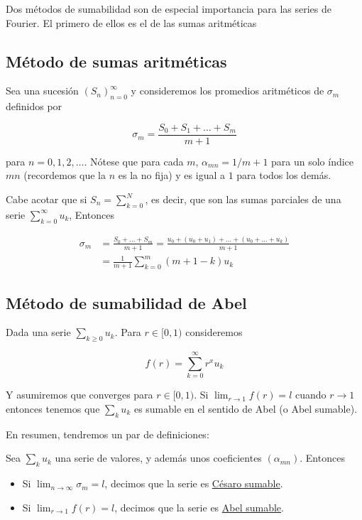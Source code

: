 Dos métodos de sumabilidad son de especial importancia para las series de Fourier. El primero de ellos es el de las sumas aritméticas

\subsection{Método de sumas aritméticas}

Sea una sucesión $(S_n)_{n=0}^{\infty}$ y consideremos los promedios aritméticos de $\sigma_m$ definidos por

\[
    \sigma_m = \frac{S_0 + S_1 + \dots + S_m}{m + 1}
\]

\noindent para $n = 0, 1, 2, \dots$. Nótese que para cada $m$, $\alpha_{mn} = 1 / m+1$ para un solo índice $mn$ (recordemos que la $n$ es la no fija) y es igual a $1$ para todos los demás.

Cabe acotar que si $S_n = \sum_{k = 0}^{N}$, es decir, que son las sumas parciales de una serie $\sum_{k=0}^{\infty} u_k$, Entonces

\begin{equation*}
    \begin{aligned}
        \sigma_m &= \frac{S_0 + \dots + S_m}{m+1} = \frac{u_0 + (u_0 + u_1) + \dots + (u_0 + \dots + u_k)}{m+1} \\
            &= \frac{1}{m+1} \sum_{k=0}^{m} (m+1-k)u_k
    \end{aligned}
\end{equation*}

\subsection{Método de sumabilidad de Abel}

Dada una serie $\sum_{k \geq 0} u_k$. Para $r \in [0,1)$ consideremos

\[
    f(r) = \sum_{k=0}^{\infty} r^x u_k
\]

Y asumiremos que converges para $r \in [0,1)$. Si $\lim_{r \to 1} f(r) = l$ cuando $r \to 1$ entonces tenemos que $\sum_k u_k$ es sumable en el sentido de Abel (o Abel sumable).

En resumen, tendremos un par de definiciones:


\begin{defn}
    Sea $\sum_{k} u_k$ una serie de valores, y además unos coeficientes $(\alpha_{mn})$. Entonces

    \begin{itemize}
        \item Si $\lim_{n \to \infty} \sigma_m = l$, decimos que la serie es \ul{Césaro sumable}.
        \item Si $\lim_{r \to 1} f(r) = l$, decimos que la serie es \ul{Abel sumable}.
    \end{itemize}
\end{defn}

